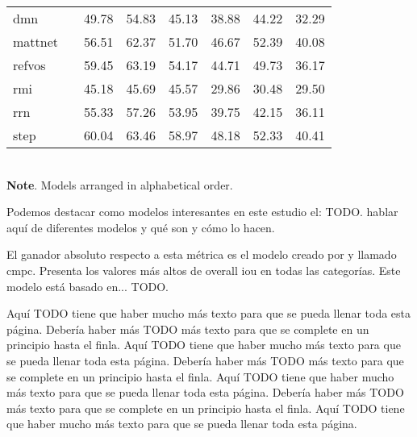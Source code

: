 \begin{table}[p]
\begin{tabular}{lc*6c}
    \acs{dmn}       & \cite{margffoy-tuay18:dynam_multim_instan_segmen}            & 49.78          & 54.83          & 45.13          & 38.88          & 44.22          & 32.29          \\
    \acs{mattnet}   & \cite{yu18:mattn}                                            & 56.51          & 62.37          & 51.70          & 46.67          & 52.39          & 40.08          \\
    \acs{refvos}    & \cite{bellver20:refvos}                                      & 59.45          & 63.19          & 54.17          & 44.71          & 49.73          & 36.17          \\
    \acs{rmi}       & \cite{liu17:recur_multim_inter_refer_image_segmen}           & 45.18          & 45.69          & 45.57          & 29.86          & 30.48          & 29.50          \\
    \acs{rrn}       & \cite{li18:refer_image_segmen_recur_refin_networ}            & 55.33          & 57.26          & 53.95          & 39.75          & 42.15          & 36.11          \\
    \acs{step}      & \cite{chen19:see_throug_text_group_refer_image_segmen}       & 60.04          & 63.46          & 58.97          & 48.18          & 52.33          & 40.41          \\
    \bottomrule
  \end{tabular}\\[1.25ex]
  {\small\textbf{Note}. Models arranged in alphabetical order.}
\end{table}

Podemos destacar como modelos interesantes en este estudio el: TODO. hablar
aquí de diferentes modelos y qué son y cómo lo hacen.

El ganador absoluto respecto a esta métrica es el modelo creado por
 y llamado
\gls{cmpc}. Presenta los valores más altos de overall \gls{iou} en todas las
categorías. Este modelo está basado en... TODO.


Aquí TODO tiene que haber mucho más texto para que se pueda llenar toda esta
página. Debería haber más TODO más texto para que se complete en un principio
hasta el finla. Aquí TODO tiene que haber mucho más texto para que se pueda
llenar toda esta página. Debería haber más TODO más texto para que se complete
en un principio hasta el finla.  Aquí TODO tiene que haber mucho más texto para
que se pueda llenar toda esta página. Debería haber más TODO más texto para que
se complete en un principio hasta el finla. Aquí TODO tiene que haber mucho más
texto para que se pueda llenar toda esta página.

